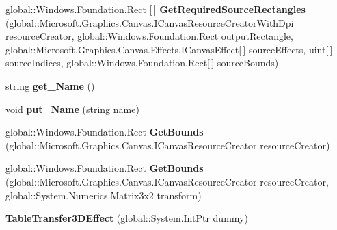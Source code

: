 \begin{DoxyCompactItemize}
global\+::\+Windows.\+Foundation.\+Rect \mbox{[}$\,$\mbox{]} {\bfseries Get\+Required\+Source\+Rectangles} (global\+::\+Microsoft.\+Graphics.\+Canvas.\+I\+Canvas\+Resource\+Creator\+With\+Dpi resource\+Creator, global\+::\+Windows.\+Foundation.\+Rect output\+Rectangle, global\+::\+Microsoft.\+Graphics.\+Canvas.\+Effects.\+I\+Canvas\+Effect\mbox{[}$\,$\mbox{]} source\+Effects, uint\mbox{[}$\,$\mbox{]} source\+Indices, global\+::\+Windows.\+Foundation.\+Rect\mbox{[}$\,$\mbox{]} source\+Bounds)
\item 
\mbox{\label{class_microsoft_1_1_graphics_1_1_canvas_1_1_effects_1_1_table_transfer3_d_effect_a5fc7cb9a5bf71f88ad31f919033b0f00}} 
string {\bfseries get\+\_\+\+Name} ()
\item 
\mbox{\label{class_microsoft_1_1_graphics_1_1_canvas_1_1_effects_1_1_table_transfer3_d_effect_a0352b2dcc61f7ab281f41815ebaa9930}} 
void {\bfseries put\+\_\+\+Name} (string name)
\item 
\mbox{\label{class_microsoft_1_1_graphics_1_1_canvas_1_1_effects_1_1_table_transfer3_d_effect_af2b350f1269e83b795233803c6f61283}} 
global\+::\+Windows.\+Foundation.\+Rect {\bfseries Get\+Bounds} (global\+::\+Microsoft.\+Graphics.\+Canvas.\+I\+Canvas\+Resource\+Creator resource\+Creator)
\item 
\mbox{\label{class_microsoft_1_1_graphics_1_1_canvas_1_1_effects_1_1_table_transfer3_d_effect_af079ef57539db85abe983a0d4859ce4d}} 
global\+::\+Windows.\+Foundation.\+Rect {\bfseries Get\+Bounds} (global\+::\+Microsoft.\+Graphics.\+Canvas.\+I\+Canvas\+Resource\+Creator resource\+Creator, global\+::\+System.\+Numerics.\+Matrix3x2 transform)
\item 
\mbox{\label{class_microsoft_1_1_graphics_1_1_canvas_1_1_effects_1_1_table_transfer3_d_effect_af9a5033370f8687d7d67be5b377d59e5}} 
{\bfseries Table\+Transfer3\+D\+Effect} (global\+::\+System.\+Int\+Ptr dummy)
\item 

\end{DoxyCompactItemize}
